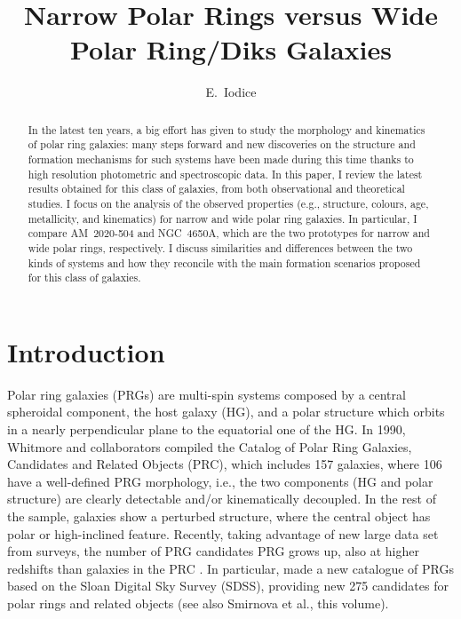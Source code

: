\documentclass[11pt,twoside]{article}
\begin{document}
\title{Narrow Polar Rings versus Wide Polar Ring/Diks Galaxies}

\author{E.~Iodice}

\begin{abstract}
In the latest ten years, a big effort has given to study the
morphology and kinematics of polar ring galaxies: many steps forward
and new discoveries on the structure and formation mechanisms for such
systems have been made during this time thanks to high resolution
photometric and spectroscopic data. In this paper, I review the latest
results obtained for this class of galaxies, from both observational
and theoretical studies. I focus on the analysis of the observed
properties (e.g., structure, colours, age, metallicity, and
kinematics) for narrow and wide polar ring galaxies. In particular, I
compare AM~2020-504 and NGC~4650A, which are the two prototypes for
narrow and wide polar rings, respectively. I discuss similarities and
differences between the two kinds of systems and how they reconcile
with the main formation scenarios proposed for this class of galaxies.
\end{abstract}


\section{Introduction}

Polar ring galaxies (PRGs) are multi-spin systems composed by a
central spheroidal component, the host galaxy (HG), and a polar
structure which orbits in a nearly perpendicular plane to the
equatorial one of the HG. In 1990, Whitmore and collaborators compiled
the Catalog of Polar Ring Galaxies, Candidates and Related Objects
(PRC), which includes 157 galaxies, where 106 have a well-defined PRG
morphology, i.e., the two components (HG and polar structure) are
clearly detectable and/or kinematically decoupled. In the rest of the
sample, galaxies show a perturbed structure, where the central object
has polar or high-inclined feature. Recently, taking advantage of new
large data set from surveys, the number of PRG candidates PRG grows
up, also at higher redshifts than galaxies in the PRC \citep[][see
also Iodice et al., this volume]{Finkelman,Resh1997a}. In
particular, \citet{Moiseev2011} made a new catalogue of PRGs based on
the Sloan Digital Sky Survey (SDSS), providing new 275 candidates for
polar rings and related objects (see also Smirnova et al., this
volume).
\end{document}
